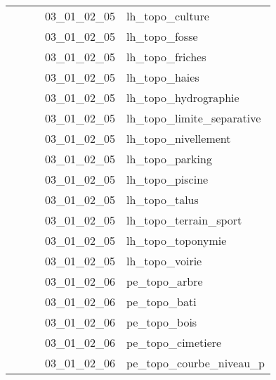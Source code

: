 \documentclass[12pt,titlepage]{book}
\begin{document}
\begin{supertabular}{|p{7.5cm}|p{7.5cm}|p{7.5cm}|c|p{10cm}|}
                   &                    &                    & 03\_01\_02\_05 & lh\_topo\_culture\\
                   &                    &                    & 03\_01\_02\_05 & lh\_topo\_fosse\\
                   &                    &                    & 03\_01\_02\_05 & lh\_topo\_friches\\
                   &                    &                    & 03\_01\_02\_05 & lh\_topo\_haies\\
                   &                    &                    & 03\_01\_02\_05 & lh\_topo\_hydrographie\\
                   &                    &                    & 03\_01\_02\_05 & lh\_topo\_limite\_separative\\
                   &                    &                    & 03\_01\_02\_05 & lh\_topo\_nivellement\\
                   &                    &                    & 03\_01\_02\_05 & lh\_topo\_parking\\
                   &                    &                    & 03\_01\_02\_05 & lh\_topo\_piscine\\
                   &                    &                    & 03\_01\_02\_05 & lh\_topo\_talus\\
                   &                    &                    & 03\_01\_02\_05 & lh\_topo\_terrain\_sport\\
                   &                    &                    & 03\_01\_02\_05 & lh\_topo\_toponymie\\
                   &                    &                    & 03\_01\_02\_05 & lh\_topo\_voirie\\
                   &                    &                    & 03\_01\_02\_06 & pe\_topo\_arbre\\
                   &                    &                    & 03\_01\_02\_06 & pe\_topo\_bati\\
                   &                    &                    & 03\_01\_02\_06 & pe\_topo\_bois\\
                   &                    &                    & 03\_01\_02\_06 & pe\_topo\_cimetiere\\
                   &                    &                    & 03\_01\_02\_06 & pe\_topo\_courbe\_niveau\_p\\

\end{supertabular}
\end{document}
